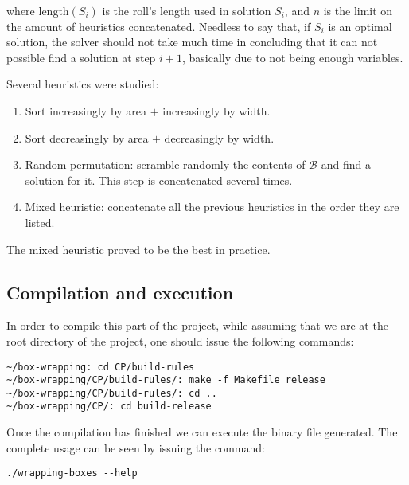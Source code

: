 where $\text{length}(S_i)$ is the roll's length used in solution $S_i$, and $n$ is
the limit on the amount of heuristics concatenated. Needless to say that, if $S_i$
is an optimal solution, the solver should not take much time in concluding that
it can not possible find a solution at step $i+1$, basically due to not being enough
variables.

\hfill

Several heuristics were studied:
\begin{enumerate}
	\item Sort increasingly by area $+$ increasingly by width.
	\item Sort decreasingly by area $+$ decreasingly by width.
	\item Random permutation: scramble randomly the contents of $\mathcal{B}$
	and find a solution for it. This step is concatenated several times.
	\item Mixed heuristic: concatenate all the previous heuristics in the order
	they are listed.
\end{enumerate}

The mixed heuristic proved to be the best in practice.

\subsection{Compilation and execution}
\label{sec:constraint-programming:compilation-execution}

In order to compile this part of the project, while assuming that we are at the
root directory of the project, one should issue the following commands:
\begin{verbatim}
~/box-wrapping: cd CP/build-rules
~/box-wrapping/CP/build-rules/: make -f Makefile release
~/box-wrapping/CP/build-rules/: cd ..
~/box-wrapping/CP/: cd build-release
\end{verbatim}

Once the compilation has finished we can execute the binary file generated. The
complete usage can be seen by issuing the command:
\begin{verbatim}
./wrapping-boxes --help
\end{verbatim}

